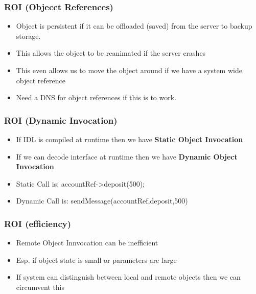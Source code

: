 \documentclass{beamer}
\begin{document}
            \begin{frame}
            	\frametitle{ROI (Objecct References)}
            	\begin{itemize}
            		\item Object is persistent if it can be offloaded (saved) from the server to backup storage. 
            		\item This allows the object to be reanimated if the server crashes
            		\item This even allows us to move the object around if we have a system wide object reference
            		\item Need a DNS for object references if this is to work.
            	\end{itemize}
            \end{frame}
      \begin{frame}
      	\frametitle{ROI (Dynamic Invocation)}
      	\begin{itemize}
      		\item If IDL is compiled at runtime then we have\textbf{ Static Object Invocation}
      		\item If we can decode interface at runtime then we have \textbf{Dynamic Object Invocation}
      		\item Static Call is:  accountRef->deposit(500);
      		\item Dynamic Call is: sendMessage(accountRef,deposit,500)
      	\end{itemize}
      \end{frame}      
      \begin{frame}
      	\frametitle{ROI (efficiency)}
      	\begin{itemize}
      		\item Remote Object Innvocation can be inefficient
      		\item Esp. if object state is small or parameters are large
      		\item If system can distinguish between local and remote objects then we can circumvent this
      	\end{itemize}
      \end{frame}  
\end{document}
